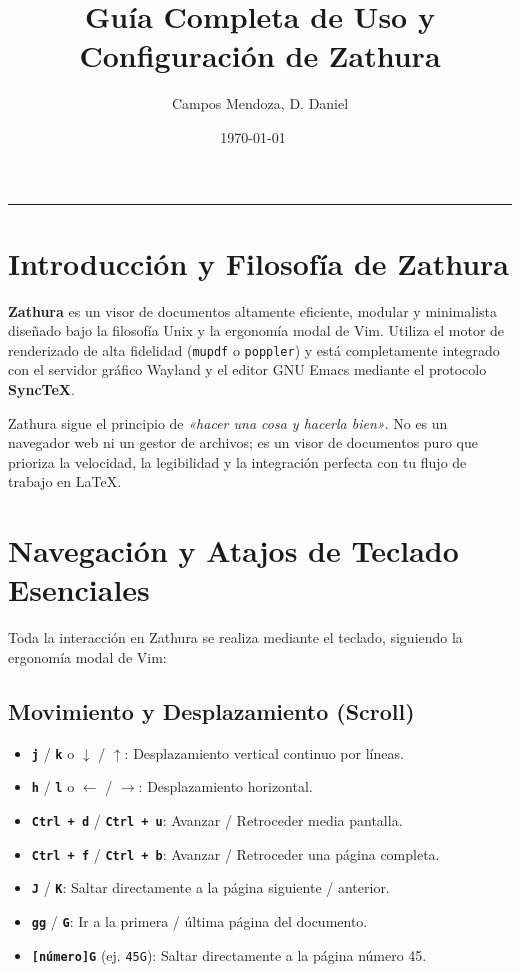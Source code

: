 \documentclass[11pt,article,spanish]{apuntes-scr}
\title[Visor de PDF Minimalista con Integración SyncTeX y Wayland]{Guía Completa de Uso y Configuración de Zathura}
\author{Campos Mendoza, D. Daniel}
\date{\today\ \textperiodcentered\ \DTMcurrenttime}
\begin{document}
\maketitle
\tableofcontents
\vspace{1.5em}\hrule\vspace{1.5em}

\section{Introducción y Filosofía de Zathura}
\textbf{Zathura} es un visor de documentos altamente eficiente, modular y minimalista diseñado bajo la filosofía Unix y la ergonomía modal de Vim. Utiliza el motor de renderizado de alta fidelidad (\texttt{mupdf} o \texttt{poppler}) y está completamente integrado con el servidor gráfico Wayland y el editor GNU Emacs mediante el protocolo \textbf{SyncTeX}.

\begin{notabox}
  Zathura sigue el principio de \textit{«hacer una cosa y hacerla bien»}. No es un navegador web ni un gestor de archivos; es un visor de documentos puro que prioriza la velocidad, la legibilidad y la integración perfecta con tu flujo de trabajo en \LaTeX.
\end{notabox}

\section{Navegación y Atajos de Teclado Esenciales}
Toda la interacción en Zathura se realiza mediante el teclado, siguiendo la ergonomía modal de Vim:

\subsection{Movimiento y Desplazamiento (Scroll)}
\begin{itemize}[leftmargin=*]
    \item \textbf{\texttt{j}} / \textbf{\texttt{k}} o \textbf{$\downarrow$} / \textbf{$\uparrow$}: Desplazamiento vertical continuo por líneas.
    \item \textbf{\texttt{h}} / \textbf{\texttt{l}} o \textbf{$\leftarrow$} / \textbf{$\rightarrow$}: Desplazamiento horizontal.
    \item \textbf{\texttt{Ctrl + d}} / \textbf{\texttt{Ctrl + u}}: Avanzar / Retroceder media pantalla.
    \item \textbf{\texttt{Ctrl + f}} / \textbf{\texttt{Ctrl + b}}: Avanzar / Retroceder una página completa.
    \item \textbf{\texttt{J}} / \textbf{\texttt{K}}: Saltar directamente a la página siguiente / anterior.
    \item \textbf{\texttt{gg}} / \textbf{\texttt{G}}: Ir a la primera / última página del documento.
    \item \textbf{\texttt{[número]G}} (ej. \texttt{45G}): Saltar directamente a la página número 45.
\end{itemize}
\end{document}
